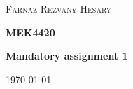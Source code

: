 \documentclass[12pt,a4paper]{report}
\begin{document}
\begin{titlepage}
	\centering
	\vspace*{3cm}
	{\scshape\LARGE Farnaz Rezvany Hesary \par}
	\vspace{1.5cm}
	{\huge\bfseries MEK4420 \par}
	\vspace{1.5cm}
	{\huge\bfseries Mandatory assignment 1 \par}
	
	\vfill

	{\Large \today\par}
\end{titlepage}
\end{document}
